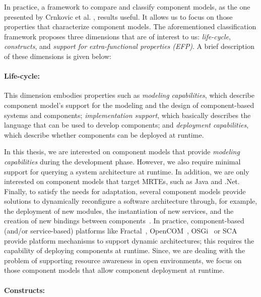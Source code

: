 In practice, a framework to compare and classify component models, as the one presented by Crnkovic et al.
\cite{Crnkovic2011}, results useful.
It allows us to focus on those properties that characterize component models.
The aforementioned classification framework proposes three dimensions that are of interest to us: \textit{life-cycle}, \textit{constructs}, and \textit{support for extra-functional properties (EFP)}.
A brief description of these dimensions is given below:

\paragraph{Life-cycle:}

This dimension embodies properties such as \textit{modeling capabilities}, which describe component model's support for the modeling and the design of component-based systems and components; 
\textit{implementation support}, which basically describes the language that can be used to develop components; and \textit{deployment capabilities}, which describe whether components can be deployed at runtime.

In this thesis, we are interested on component models that provide \textit{modeling capabilities} during the development phase.
However, we also require minimal support for querying a system architecture at runtime. 
In addition, we are only interested on component models that target MRTEs, such as Java and .Net.
Finally, to satisfy the needs for adaptation, several component models provide solutions to dynamically reconfigure a software architecture through, for example, the deployment of new modules, the instantiation of new services, and the creation of new bindings between components~\cite{Porter:2014:RMC:2602458.2602471, Zheng:2014:RCC:2679601.2680405, Irmert:2008:RAS:1370018.1370036, Ghezzi:2010:QDD:2163764.2163774}. 
In practice, component-based (and/or service-based) platforms like Fractal~\cite{bruneton06}, OpenCOM~\cite{BlairCULJ04}, OSGi~\cite{OSGI:r5} or SCA~\cite{SEINTURIER:2011:INRIA-00567442:1} provide platform mechanisms to support dynamic architectures; this requires the capability of deploying components at runtime.
Since, we are dealing with the problem of supporting resource awareness in open environments, we focus on those component models that allow component deployment at runtime.


\paragraph{Constructs:}

